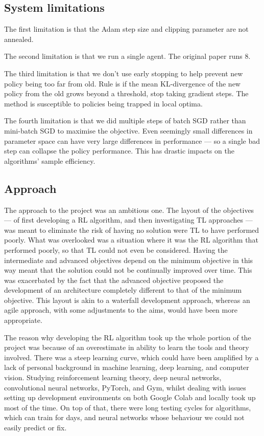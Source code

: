 \documentclass[12pt,a4paper]{article}
\begin{document}
\subsection{System limitations}
The first limitation is that the Adam step size and clipping parameter are not annealed.

The second limitation is that we run a single agent. The original paper runs 8. 

The third limitation is that we don't use early stopping to help prevent new policy being too far from old. Rule is if the mean KL-divergence of the new policy from the old grows beyond a threshold, stop taking gradient steps. The method is susceptible to policies being trapped in local optima.

The fourth limitation is that we did multiple steps of batch SGD rather than mini-batch SGD to maximise the objective. Even seemingly small differences in parameter space can have very large differences in performance --- so a single bad step can collapse the policy performance. This has drastic impacts on the algorithms' sample efficiency.

\subsection{Approach}
The approach to the project was an ambitious one. The layout of the objectives --- of first developing a RL algorithm, and then investigating TL approaches --- was meant to eliminate the risk of having no solution were TL to have performed poorly. What was overlooked was a situation where it was the RL algorithm that performed poorly, so that TL could not even be considered. Having the intermediate and advanced objectives depend on the minimum objective in this way meant that the solution could not be continually improved over time. This was exacerbated by the fact that the advanced objective proposed the development of an architecture completely different to that of the minimum objective. This layout is akin to a waterfall development approach, whereas an agile approach, with some adjustments to the aims, would have been more appropriate. 

The reason why developing the RL algorithm took up the whole portion of the project was because of an overestimate in ability to learn the tools and theory involved. There was a steep learning curve, which could have been amplified by a lack of personal background in machine learning, deep learning, and computer vision. Studying reinforcement learning theory, deep neural networks, convolutional neural networks, PyTorch, and Gym, whilst dealing with issues setting up development environments on both Google Colab and locally took up most of the time. On top of that, there were long testing cycles for algorithms, which can train for days, and neural networks whose behaviour we could not easily predict or fix.
\end{document}
